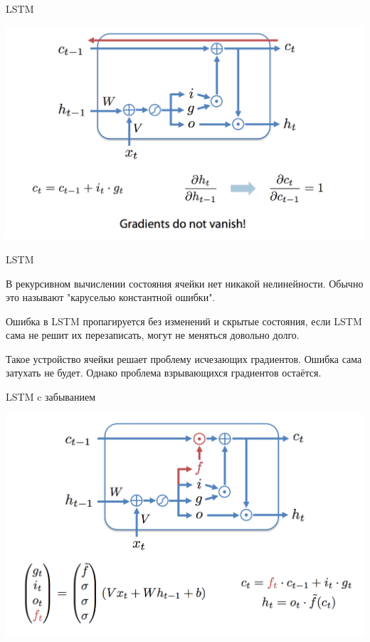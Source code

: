\documentclass[notes,12pt, aspectratio=169]{beamer}
\newenvironment{wideitemize}{\itemize\addtolength{\itemsep}{10pt}}{\enditemize}
\begin{document}
\begin{frame}{LSTM}
\begin{center}
	\includegraphics[width=.8\linewidth]{lstm7.png}
\end{center}
\end{frame}


\begin{frame}{LSTM}
\begin{wideitemize}
	\item  В рекурсивном вычислении состояния ячейки нет никакой нелинейности. Обычно это называют "каруселью константной ошибки". 
	
	\item Ошибка в LSTM пропагируется без изменений и скрытые состояния, если LSTM сама не решит их перезаписать, могут не меняться довольно долго.
	
	\item Такое устройство ячейки решает проблему исчезающих градиентов. Ошибка сама затухать не будет. Однако проблема взрывающихся градиентов остаётся. 
	
\end{wideitemize}
\end{frame}

\begin{frame}{LSTM c забыванием}
\begin{center}
	\includegraphics[width=.8\linewidth]{lstm8.png}
\end{center}
\end{frame}
\end{document}

